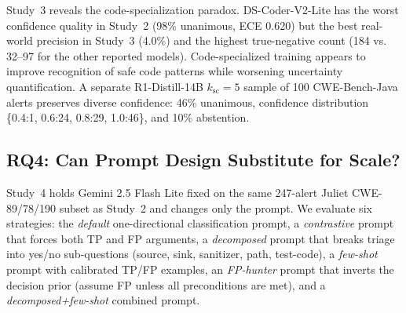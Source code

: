 \begin{table}[t]
\centering
\caption{Study~3 real-world validation on 549 CWE-Bench-Java CodeQL alerts from 45 projects ($k_{\mathrm{sc}}=1$). Metrics are pre-escalation.}
\label{tab:cwebench}
\small
\setlength{\tabcolsep}{3.5pt}
\end{table}

Study~3 reveals the code-specialization paradox. DS-Coder-V2-Lite has the worst confidence quality in Study~2 (98\% unanimous, ECE 0.620) but the best real-world precision in Study~3 (4.0\%) and the highest true-negative count (184 vs. 32--97 for the other reported models). Code-specialized training appears to improve recognition of safe code patterns while worsening uncertainty quantification. A separate R1-Distill-14B $k_{\mathrm{sc}}=5$ sample of 100 CWE-Bench-Java alerts preserves diverse confidence: 46\% unanimous, confidence distribution \{0.4:1, 0.6:24, 0.8:29, 1.0:46\}, and 10\% abstention.

\subsection{RQ4: Can Prompt Design Substitute for Scale?}

Study~4 holds Gemini 2.5 Flash Lite fixed on the same 247-alert Juliet CWE-89/78/190 subset as Study~2 and changes only the prompt. We evaluate six strategies: the \emph{default} one-directional classification prompt, a \emph{contrastive} prompt that forces both TP and FP arguments, a \emph{decomposed} prompt that breaks triage into yes/no sub-questions (source, sink, sanitizer, path, test-code), a \emph{few-shot} prompt with calibrated TP/FP examples, an \emph{FP-hunter} prompt that inverts the decision prior (assume FP unless all preconditions are met), and a \emph{decomposed+few-shot} combined prompt.

